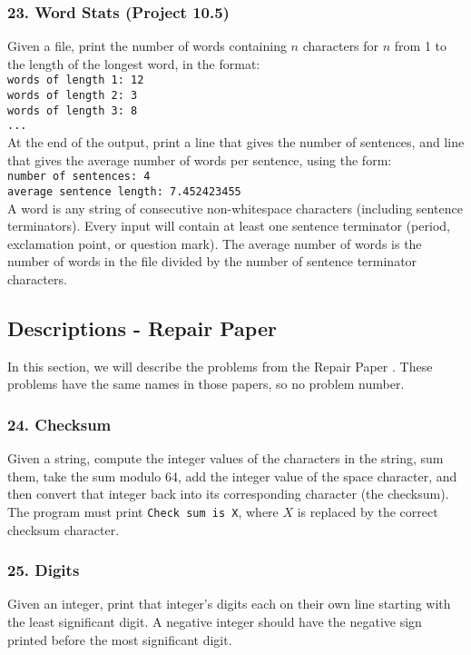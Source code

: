 \documentclass{sig-alternate}
\begin{document}
\subsubsection*{23. Word Stats (Project 10.5)}
Given a file, print the number of words containing $n$ characters for $n$ from 1 to the length of the longest word, in the format:
\texttt{ \\
words of length 1: 12 \\
words of length 2: 3 \\
words of length 3: 8 \\
... \\
} %
At the end of the output, print a line that gives the number of sentences, and line that gives the average number of words per sentence, using the form:
\texttt{ \\
number of sentences: 4 \\
average sentence length: 7.452423455 \\
} %
A word is any string of consecutive non-whitespace characters (including sentence terminators). Every input will contain at least one sentence terminator (period, exclamation point, or question mark). The average number of words is the number of words in the file divided by the number of sentence terminator characters.


\subsection{Descriptions - Repair Paper}

In this section, we will describe the problems from the Repair Paper \cite{ManyBugsAndIntroClass, Brun13TRgptest}. These problems have the same names in those papers, so no problem number.

\subsubsection*{24. Checksum}
Given a string, compute the integer values of the characters in the string, sum them, take the sum modulo 64, add the integer value of the space character, and then convert that integer back into its corresponding character (the checksum). The program must print \texttt{Check sum is X}, where $X$ is replaced by the correct checksum character.

\subsubsection*{25. Digits}
Given an integer, print that integer's digits each on their own line starting with the least significant digit. A negative integer should have the negative sign printed before the most significant digit.
\end{document}
